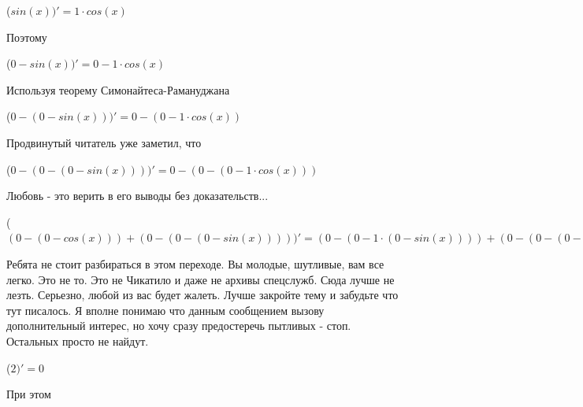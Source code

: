 \documentclass[12pt,a4paper,fleqn]{article}
\begin{document}
\begin{center}
\begin{center}
\begin{center}
\begin{center}
\begin{center}
\begin{center}
\begin{center}
\begin{center}
\begin{center}
\begin{center}
\begin{center}
\begin{center}
\begin{center}
\begin{center}
\begin{center}
\begin{center}
\begin{center}
\begin{center}
\begin{center}
\begin{center}
\begin{center}
\begin{center}
\begin{center}
\begin{center}
\begin{center}
\begin{center}
\begin{center}
\begin{center}
\begin{center}
\begin{center}
\begin{center}
\begin{center}
\begin{center}
\begin{center}
\begin{center}
\begin{center}
\begin{center}
\begin{center}
\begin{center}
\begin{center}
\begin{center}
\begin{center}
\begin{center}
\begin{center}
\begin{center}
 ($sin(x))'
  = 1 \cdot cos(x)$\end{center}
Поэтому

\begin{center}
 ($0-sin(x))'
  = 0-1 \cdot cos(x)$\end{center}
Используя теорему Симонайтеса-Рамануджана

\begin{center}
 ($0-(0-sin(x)))'
  = 0-(0-1 \cdot cos(x))$\end{center}
Продвинутый читатель уже заметил, что

\begin{center}
 ($0-(0-(0-sin(x))))'
  = 0-(0-(0-1 \cdot cos(x)))$\end{center}
Любовь - это верить в его выводы без доказательств...

\begin{center}
 ($(0-(0-cos(x)))+(0-(0-(0-sin(x)))))'
  = (0-(0-1 \cdot (0-sin(x))))+(0-(0-(0-1 \cdot cos(x))))$\end{center}
Ребята не стоит разбираться в этом переходе. Вы молодые, шутливые, вам все легко. Это не то. Это не Чикатило и даже не архивы спецслужб. Сюда лучше не лезть. Серьезно, любой из вас будет жалеть. Лучше закройте тему и забудьте что тут писалось. Я вполне понимаю что данным сообщением вызову дополнительный интерес, но хочу сразу предостеречь пытливых - стоп. Остальных просто не найдут.

\begin{center}
 ($2)'
  = 0$\end{center}
При этом


\end{center}
\end{center}
\end{center}
\end{center}
\end{center}
\end{center}
\end{center}
\end{center}
\end{center}
\end{center}
\end{center}
\end{center}
\end{center}
\end{center}
\end{center}
\end{center}
\end{center}
\end{center}
\end{center}
\end{center}
\end{center}
\end{center}
\end{center}
\end{center}
\end{center}
\end{center}
\end{center}
\end{center}
\end{center}
\end{center}
\end{center}
\end{center}
\end{center}
\end{center}
\end{center}
\end{center}
\end{center}
\end{center}
\end{center}
\end{center}
\end{center}
\end{center}
\end{center}
\end{center}
\end{document}
